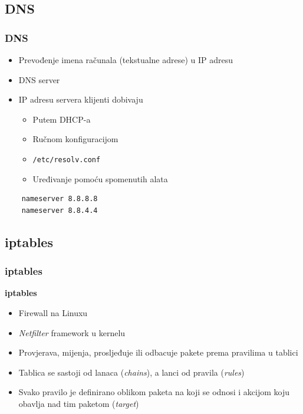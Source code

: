 \documentclass[t,table,usenames,dvipsnames]{beamer}
\begin{document}
\subsection{DNS}
\begin{frame}[fragile]
	\frametitle{DNS}
	\begin{itemize}
		\item Prevođenje imena računala (tekstualne adrese) u IP adresu
		\item DNS server
		\item IP adresu servera klijenti dobivaju
		\begin{itemize}
			\item Putem DHCP-a
			\item Ručnom konfiguracijom
			\item[] \texttt{/etc/resolv.conf}
			\item[] Uređivanje pomoću spomenutih alata
		\end{itemize}
	\end{itemize}
	\begin{verbatim}
	nameserver 8.8.8.8
	nameserver 8.8.4.4
	\end{verbatim}
\end{frame}

\subsection{iptables}
\begin{frame}
	\frametitle{iptables}
	\textbf{iptables}
	\begin{itemize}
		\item Firewall na Linuxu
		\item \emph{Netfilter} framework u kernelu
	\end{itemize}
	
	\begin{itemize}
		\item Provjerava, mijenja, prosljeđuje ili odbacuje pakete prema pravilima u tablici
		\item Tablica se sastoji od lanaca (\emph{chains}), a lanci od pravila (\emph{rules})
		\item Svako pravilo je definirano oblikom paketa na koji se odnosi i akcijom koju obavlja nad tim paketom (\emph{target})
	\end{itemize}
\end{frame}
\end{document}
